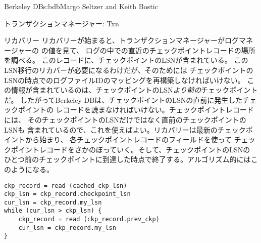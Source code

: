 \begin{aosachapter}{Berkeley DB}{s:bdb}{Margo Seltzer and Keith Bostic}
\begin{aosasect1}{トランザクションマネージャー: Txn}
\begin{aosasect2}{リカバリー}
リカバリーが始まると、トランザクションマネージャーがログマネージャーの
の値を見て、
ログの中での直近のチェックポイントレコードの場所を調べる。
このレコードに、チェックポイントのLSNが含まれている。
このLSN移行のリカバーが必要になるわけだが、そのためには
チェックポイントのLSNの時点でのログファイルIDのマッピングを再構築しなければいけない。
この情報が含まれているのは、チェックポイントのLSN\emph{より前の}チェックポイントだ。
したがってBerkeley DBは、チェックポイントのLSNの直前に発生したチェックポイントの
レコードを読まなければいけない。チェックポイントレコードには、
そのチェックポイントのLSNだけではなく直前のチェックポイントのLSNも
含まれているので、これを使えばよい。リカバリーは最新のチェックポイントから始まり、
各チェックポイントレコードのフィールドを使って
チェックポイントレコードをさかのぼっていく。そして、チェックポイントのLSNの
ひとつ前のチェックポイントに到達した時点で終了する。アルゴリズム的にはこのようになる。

\vspace{-0.2cm}
\begin{verbatim}
ckp_record = read (cached_ckp_lsn)
ckp_lsn = ckp_record.checkpoint_lsn
cur_lsn = ckp_record.my_lsn
while (cur_lsn > ckp_lsn) {
    ckp_record = read (ckp_record.prev_ckp)
    cur_lsn = ckp_record.my_lsn
}
\end{verbatim}
\vspace{-0.2cm}


\end{aosasect2}
\end{aosasect1}
\end{aosachapter}
